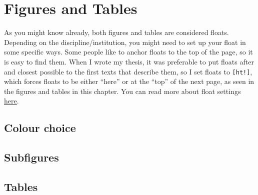 \chapter{Figures and Tables}
As you might know already, both figures and tables are considered \glspl{float}. Depending on the discipline/institution, you might need to set up your float in some specific ways. Some people like to anchor floats to the top of the page, so it is easy to find them. When I wrote my thesis, it was preferable to put floats after and closest possible to the first texts that describe them, so I set floats to \texttt{[ht!]}, which forces floats to be either ``here'' or at the ``top'' of the next page, as seen in the figures and tables in this chapter. You can read more about float settings \href{https://www.overleaf.com/learn/latex/Positioning_of_Figures}{here}.  

\section{Colour choice}
\section{Subfigures}
\section{Tables}